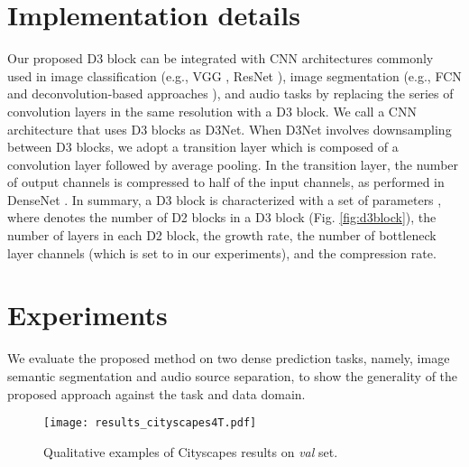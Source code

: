 \documentclass[final]{cvpr}
\begin{document}
\section{Implementation details}
Our proposed D3 block can be integrated with CNN architectures commonly used in image classification (e.g., VGG \cite{Zisserman2015VGG}, ResNet \cite{He16ResNet}), image segmentation (e.g., FCN \cite{Long15} and deconvolution-based approaches \cite{Noh15,Ronneberger15UNet, Fu19}), and audio tasks \cite{Takahashi17} by replacing the series of convolution layers in the same resolution with a D3 block. We call a CNN architecture that uses D3 blocks as D3Net. When D3Net involves downsampling between D3 blocks, we adopt a transition layer which is composed of a  convolution layer followed by  average pooling. In the transition layer, the number of output channels is compressed to half of the input channels, as performed in DenseNet \cite{Huang17Densenet}.
In summary, a D3 block is characterized with a set of parameters , where  denotes the number of D2 blocks in a D3 block (Fig. \ref{fig:d3block}),  the number of layers in each D2 block,  the growth rate,  the number of bottleneck layer channels (which is set to  in our experiments), and  the compression rate.

\section{Experiments}
We evaluate the proposed method on two dense prediction tasks, namely, image semantic segmentation and audio source separation, to show the generality of the proposed approach against the task and data domain.


\begin{figure}[t]
  \centering
  \texttt{[image: results\_cityscapes4T.pdf]}
  \caption{Qualitative examples of Cityscapes results on \textit{val} set.}
  \label{fig:results_cityscapes}
\end{figure}
\end{document}
